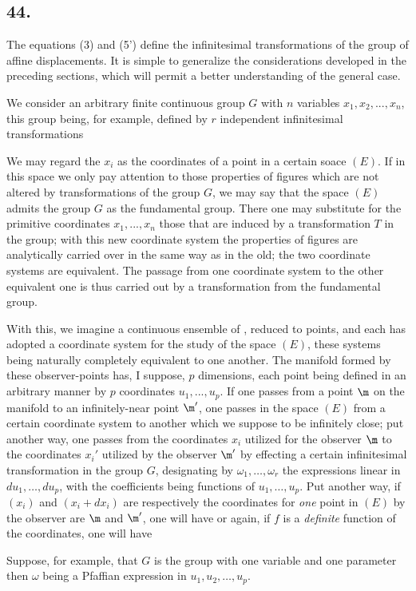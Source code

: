 \subsection*{44.}

The equations (3) and (5') define the infinitesimal transformations of the group of affine displacements. It is simple to generalize the considerations developed in the preceding sections, which will permit a better understanding of the general case.

We consider an arbitrary finite continuous group $G$ with $n$ variables $x_1, x_2, ..., x_n$, this group being, for example, defined by $r$ independent infinitesimal transformations

We may regard the $x_i$ as the coordinates of a point in a certain soace $(E)$. If in this space we only pay attention to those properties of figures which are not altered by transformations of the group $G$, we may say that the space $(E)$ admits the group $G$ as the fundamental group. There one may substitute for the primitive coordinates $x_1, ..., x_n$ those that are induced by a transformation $T$ in the group; with this new coordinate system the properties of figures are analytically carried over in the same way as in the old; the two coordinate systems are equivalent. The passage from one coordinate system to the other equivalent one is thus carried out by a transformation from the fundamental group.

With this, we imagine a continuous ensemble of , reduced to points, and each has adopted a coordinate system for the study of the space $(E)$, these systems being naturally completely equivalent to one another. The manifold formed by these observer-points has, I suppose, $p$ dimensions, each point being defined in an arbitrary manner by $p$ coordinates $u_1, ..., u_p$. If one passes from a point $\m$ on the manifold to an infinitely-near point $\m'$, one passes in the space $(E)$ from a certain coordinate system to another which we suppose to be infinitely close; put another way, one passes from the coordinates $x_i$ utilized for the observer $\m$ to the coordinates $x_i'$ utilized by the observer $\m'$ by effecting a certain infinitesimal transformation in the group $G$, 
designating by $\omega_1, \dots, \omega_r$ the expressions linear in $du_1, \dots, du_p$, with the coefficients being functions of $u_1, \dots, u_p$. Put another way, if $(x_i)$ and $(x_i + dx_i)$ are respectively the coordinates for \textit{one} point in $(E)$ by the observer are $\m$ and $\m'$, one will have
or again, if $f$ is a \textit{definite} function of the coordinates, one will have

Suppose, for example, that $G$ is the group with one variable and one parameter
then
$\omega$ being a Pfaffian expression in $u_1, u_2, \dots, u_p$. 